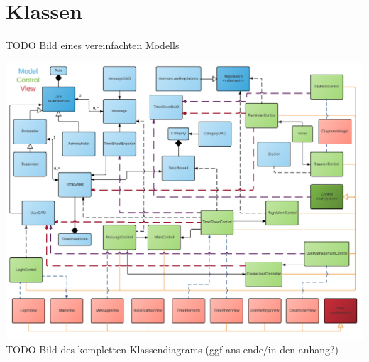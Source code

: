 \section{Klassen}
    TODO Bild eines vereinfachten Modells

    \includegraphics[width=\linewidth]{Diagramms/class/overview.pdf}\\
    TODO Bild des kompletten Klassendiagrams (ggf ans ende/in den anhang?)
    \newpage
